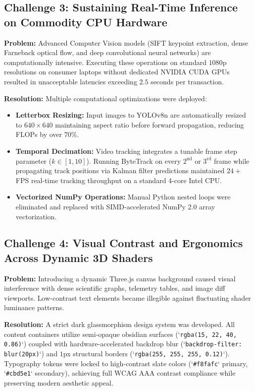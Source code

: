 \subsection{Challenge 3: Sustaining Real-Time Inference on Commodity CPU Hardware}
\textbf{Problem:} Advanced Computer Vision models (SIFT keypoint extraction, dense Farneback optical flow, and deep convolutional neural networks) are computationally intensive. Executing these operations on standard $1080$p resolutions on consumer laptops without dedicated NVIDIA CUDA GPUs resulted in unacceptable latencies exceeding $2.5$ seconds per transaction.

\textbf{Resolution:} Multiple computational optimizations were deployed:
\begin{itemize}
    \item \textbf{Letterbox Resizing:} Input images to YOLOv8n are automatically resized to $640\times640$ maintaining aspect ratio before forward propagation, reducing FLOPs by over $70\%$.
    \item \textbf{Temporal Decimation:} Video tracking integrates a tunable frame step parameter ($k \in [1, 10]$). Running ByteTrack on every $2^{\text{nd}}$ or $3^{\text{rd}}$ frame while propagating track positions via Kalman filter predictions maintained $24+$ FPS real-time tracking throughput on a standard 4-core Intel CPU.
    \item \textbf{Vectorized NumPy Operations:} Manual Python nested loops were eliminated and replaced with SIMD-accelerated NumPy 2.0 array vectorization.
\end{itemize}

\subsection{Challenge 4: Visual Contrast and Ergonomics Across Dynamic 3D Shaders}
\textbf{Problem:} Introducing a dynamic Three.js canvas background caused visual interference with dense scientific graphs, telemetry tables, and image diff viewports. Low-contrast text elements became illegible against fluctuating shader luminance patterns.

\textbf{Resolution:} A strict dark glassmorphism design system was developed. All content containers utilize semi-opaque obsidian surfaces (`\texttt{rgba(15, 22, 40, 0.86)}`) coupled with hardware-accelerated backdrop blur (`\texttt{backdrop-filter: blur(20px)}`) and $1$px structural borders (`\texttt{rgba(255, 255, 255, 0.12)}`). Typography tokens were locked to high-contrast slate colors (`\texttt{\#f8fafc}` primary, `\texttt{\#cbd5e1}` secondary), achieving full WCAG AAA contrast compliance while preserving modern aesthetic appeal.

